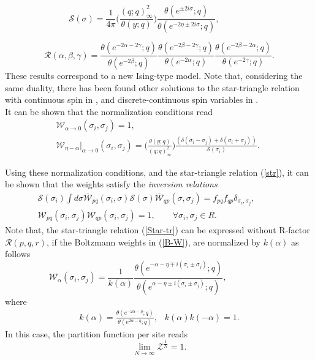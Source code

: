 \documentclass[a4paper,11pt]{article}%
\numberwithin{equation}{section}
\begin{document}
\begin{equation}\label{S}
     \mathcal{S}(\sigma)=\frac{1}{4\pi}\Big(\frac{(q;q)^2_{\infty}}{\theta(y;q)}\Big)  \frac{\theta(e^{\pm 2i\sigma};q)}{\theta(e^{-2\eta\pm 2i\sigma};q)}, \qquad\quad\,\,\,
\end{equation}

\begin{equation}\label{R}
    \mathcal{ R}(\alpha,\beta,\gamma)= \frac{\theta(e^{-2\alpha-2\gamma};q)}{\theta(e^{-2\beta};q)} \frac{\theta(e^{-2\beta-2\gamma};q)}{\theta(e^{-2\alpha};q)} \frac{\theta(e^{-2\beta-2\alpha};q)}{\theta(e^{-2\gamma};q)}.
\end{equation}
These results correspond to a new Ising-type model. Note that, considering the same duality, there has been found other solutions to the star-triangle relation with continuous spin in \cite{Spiridonov:2010em}, and discrete-continuous spin variables in \cite{Kels:2015bda,Gahramanov:2015cva}.\\ It can be shown that
the normalization conditions read
\begin{align} \label{nc}\nonumber
      \mathcal{W}_{\alpha\rightarrow 0}(\sigma_i,\sigma_j)=1,  \qquad \qquad \qquad  \qquad\qquad\qquad\qquad \,\,\,\,\,
     \\
      \mathcal{W}_{\eta-\alpha}|_{\alpha\rightarrow 0}(\sigma_i,\sigma_j)= \Big(\frac{\theta(y;q)}{(q;q)^2_{\infty}}\Big) \frac{(\delta(\sigma_i-\sigma_j)+\delta(\sigma_i+\sigma_j))}{\mathcal{S}(\sigma_i)}.
\end{align}

Using these normalization conditions, and the star-triangle relation (\ref{str}), it can be shown that the  weights  satisfy the  \emph{inversion relations} 
\begin{align}\label{I-R}
    \mathcal{S}(\sigma_i)\int d \sigma \overline{\mathcal{W}}_{pq}(\sigma_i,\sigma)\mathcal{S}(\sigma) \overline{\mathcal{W}}_{qp}(\sigma,\sigma_j)=f_{pq}f_{qp} \delta_{\sigma_i,\sigma_j}, \qquad\quad\\\nonumber
    \mathcal{W}_{pq}(\sigma_i,\sigma_j)\mathcal{W}_{qp}(\sigma_i,\sigma_j)=1, \qquad \forall \sigma_i,\sigma_j \in R. 
\end{align} 
Note that, the star-triangle relation (\ref{Star-tr}) can be expressed without R-factor $\mathcal{R}(p,q,r)$, if the Boltzmann weights in (\ref{B-W}), are normalized by $k(\alpha)$ as follows
\begin{equation}\label{NB-W}
     \mathcal{ W}_{\alpha}(\sigma_i,\sigma_j)=\frac{1}{k(\alpha)}\frac{\theta( e^{-\alpha-\eta\mp i(\sigma_i\pm \sigma_j)};q)}{\theta(e^{\alpha-\eta\pm i(\sigma_i\pm \sigma_j)};q)},\qquad\qquad \quad
\end{equation}
where 
\begin{align}\label{K}
     k(\alpha)= \frac{\theta(e^{-2\alpha-\eta};q)}{\theta(e^{2\alpha-\eta};q)},\;\;\ k(\alpha) k(-\alpha)=1.
\end{align}
In this case, the partition function per site reads 
 \begin{equation}
     \lim _{N\rightarrow\infty} \mathcal{Z}^{\frac{1}{N}}=1.
      \end{equation}
\end{document}
